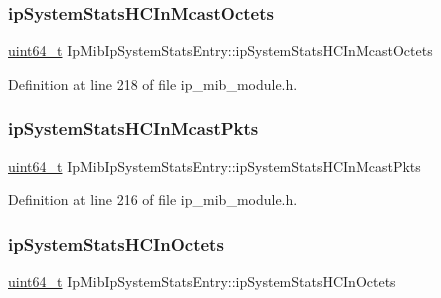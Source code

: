 \subsubsection{\texorpdfstring{ip\+System\+Stats\+H\+C\+In\+Mcast\+Octets}{ipSystemStatsHCInMcastOctets}}
{\footnotesize\ttfamily \hyperlink{stdint_8h_aec6fcb673ff035718c238c8c9d544c47}{uint64\+\_\+t} Ip\+Mib\+Ip\+System\+Stats\+Entry\+::ip\+System\+Stats\+H\+C\+In\+Mcast\+Octets}



Definition at line 218 of file ip\+\_\+mib\+\_\+module.\+h.

\mbox{\label{structIpMibIpSystemStatsEntry_a61e76a4a3372081e8fb952547e274594}} 
\subsubsection{\texorpdfstring{ip\+System\+Stats\+H\+C\+In\+Mcast\+Pkts}{ipSystemStatsHCInMcastPkts}}
{\footnotesize\ttfamily \hyperlink{stdint_8h_aec6fcb673ff035718c238c8c9d544c47}{uint64\+\_\+t} Ip\+Mib\+Ip\+System\+Stats\+Entry\+::ip\+System\+Stats\+H\+C\+In\+Mcast\+Pkts}



Definition at line 216 of file ip\+\_\+mib\+\_\+module.\+h.

\mbox{\label{structIpMibIpSystemStatsEntry_adf78ae7c1b825d577d18c735a4a337e7}} 
\subsubsection{\texorpdfstring{ip\+System\+Stats\+H\+C\+In\+Octets}{ipSystemStatsHCInOctets}}
{\footnotesize\ttfamily \hyperlink{stdint_8h_aec6fcb673ff035718c238c8c9d544c47}{uint64\+\_\+t} Ip\+Mib\+Ip\+System\+Stats\+Entry\+::ip\+System\+Stats\+H\+C\+In\+Octets}



